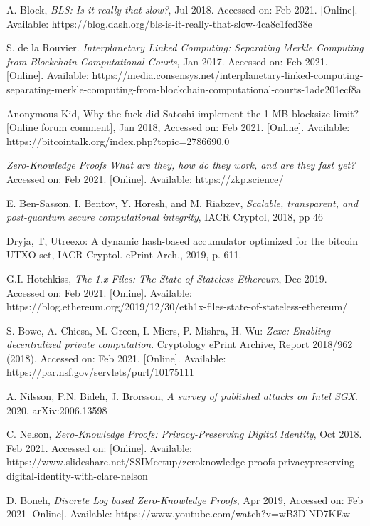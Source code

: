 \documentclass{ctexart}
\begin{document}
\begin{thebibliography}{00}
  A. Block, \textit{BLS: Is it really that slow?}, Jul 2018. Accessed on: Feb 2021. [Online]. Available: https://blog.dash.org/bls-is-it-really-that-slow-4ca8c1fcd38e

  S. de la Rouvier. \textit{Interplanetary Linked Computing: Separating Merkle Computing from Blockchain Computational Courts}, Jan 2017. Accessed on: Feb 2021. [Online]. Available: https://media.consensys.net/interplanetary-linked-computing-separating-merkle-computing-from-blockchain-computational-courts-1ade201ecf8a

 Anonymous Kid, Why the fuck did Satoshi implement the 1 MB blocksize limit? [Online forum comment], Jan 2018, Accessed on: Feb 2021. [Online]. Available:  https://bitcointalk.org/index.php?topic=2786690.0

 \textit{Zero-Knowledge Proofs What are they, how do they work, and are they fast yet?} Accessed on: Feb 2021. [Online]. Available: https://zkp.science/

 E. Ben-Sasson, I. Bentov, Y. Horesh, and M. Riabzev, \textit{Scalable, transparent, and post-quantum secure computational integrity}, IACR Cryptol, 2018, pp 46 

 Dryja, T, Utreexo: A dynamic hash-based accumulator optimized for the bitcoin UTXO set, IACR Cryptol. ePrint Arch., 2019, p. 611.

 G.I. Hotchkiss, \textit{The 1.x Files: The State of Stateless Ethereum}, Dec 2019. Accessed on: Feb 2021. [Online]. Available:   https://blog.ethereum.org/2019/12/30/eth1x-files-state-of-stateless-ethereum/

 S. Bowe, A. Chiesa, M. Green, I. Miers, P. Mishra, H. Wu: \textit{Zexe: Enabling decentralized private computation}. Cryptology ePrint Archive, Report 2018/962 (2018). Accessed on: Feb 2021. [Online]. Available:  https://par.nsf.gov/servlets/purl/10175111

 A. Nilsson, P.N. Bideh, J. Brorsson, \textit{A survey of published attacks on Intel SGX}. 2020, arXiv:2006.13598

 C. Nelson, \textit{Zero-Knowledge Proofs: Privacy-Preserving Digital Identity}, Oct 2018. Feb 2021. Accessed on: [Online]. Available: https://www.slideshare.net/SSIMeetup/zeroknowledge-proofs-privacypreserving-digital-identity-with-clare-nelson

 D. Boneh, \textit{Discrete Log based Zero-Knowledge Proofs}, Apr 2019,  Accessed on: Feb 2021 [Online].  Available: https://www.youtube.com/watch?v=wB3DlND7KEw


\end{thebibliography}
\end{document}
